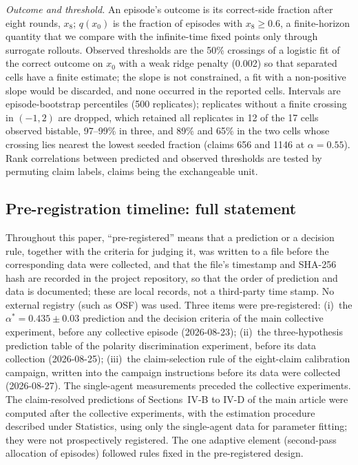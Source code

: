 \documentclass[11pt]{article}
\newcommand{\astar}{\alpha^{*}}
\begin{document}
\emph{Outcome and threshold.} An episode's outcome is its correct-side
fraction after eight rounds, $x_8$; $q(x_0)$ is the fraction of episodes with
$x_8 \ge 0.6$, a finite-horizon quantity that we compare with the
infinite-time fixed points only through surrogate rollouts. Observed
thresholds are the 50\% crossings of a logistic fit of the correct outcome on
$x_0$ with a weak ridge penalty (0.002) so that separated cells have a
finite estimate; the slope is not constrained, a fit with a non-positive slope
would be discarded, and none occurred in the reported cells. Intervals are
episode-bootstrap percentiles (500 replicates); replicates without a finite
crossing in $(-1, 2)$ are dropped, which retained all replicates in 12 of the
17 cells observed bistable, 97--99\% in three, and 89\% and 65\% in the two
cells whose crossing lies nearest the lowest seeded fraction (claims 656 and
1146 at $\alpha = 0.55$). Rank correlations between predicted and observed thresholds are
tested by permuting claim labels, claims being the exchangeable unit.

\subsection{Pre-registration timeline: full statement}

Throughout this paper, ``pre-registered'' means that a prediction or a
decision rule, together with the criteria for judging it, was written to a
file before the corresponding data were collected, and that the file's
timestamp and SHA-256 hash are recorded in the project repository, so that
the order of prediction and data is documented; these are local records, not
a third-party time stamp. No external registry (such as OSF) was used. Three items were
pre-registered: (i)~the $\astar = 0.435 \pm 0.03$ prediction and the decision
criteria of the main collective experiment, before any collective episode
(2026-08-23); (ii)~the three-hypothesis prediction table of the polarity
discrimination experiment, before its data collection (2026-08-25);
(iii)~the claim-selection rule of the eight-claim calibration campaign,
written into the campaign instructions before its data were collected
(2026-08-27). The single-agent measurements preceded the collective
experiments. The claim-resolved predictions of
Sections~IV-B to IV-D of the main article were computed after the
collective experiments, with the estimation procedure described under
Statistics, using only the single-agent data for parameter fitting; they were
not prospectively registered. The one adaptive element (second-pass allocation of episodes)
followed rules fixed in the pre-registered design.




\end{document}
